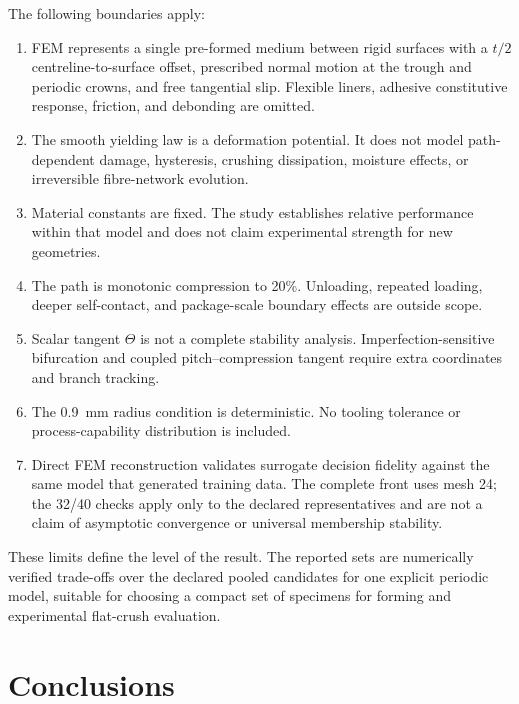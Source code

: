 \documentclass[11pt]{article}
\begin{document}
The following boundaries apply:
\begin{enumerate}[leftmargin=*,itemsep=3pt]
\item FEM represents a single pre-formed medium between rigid surfaces with a $t/2$ centreline-to-surface offset, prescribed normal motion at the trough and periodic crowns, and free tangential slip. Flexible liners, adhesive constitutive response, friction, and debonding are omitted.
\item The smooth yielding law is a deformation potential. It does not model path-dependent damage, hysteresis, crushing dissipation, moisture effects, or irreversible fibre-network evolution.
\item Material constants are fixed. The study establishes relative performance within that model and does not claim experimental strength for new geometries.
\item The path is monotonic compression to 20\%. Unloading, repeated loading, deeper self-contact, and package-scale boundary effects are outside scope.
\item Scalar tangent $\Theta$ is not a complete stability analysis. Imperfection-sensitive bifurcation and coupled pitch--compression tangent require extra coordinates and branch tracking.
\item The 0.9~mm radius condition is deterministic. No tooling tolerance or process-capability distribution is included.
\item Direct FEM reconstruction validates surrogate decision fidelity against the same model that generated training data. The complete front uses mesh 24; the 32/40 checks apply only to the declared representatives and are not a claim of asymptotic convergence or universal membership stability.
\end{enumerate}

These limits define the level of the result. The reported sets are numerically verified trade-offs over the declared pooled candidates for one explicit periodic model, suitable for choosing a compact set of specimens for forming and experimental flat-crush evaluation.

\section{Conclusions}
\end{document}
